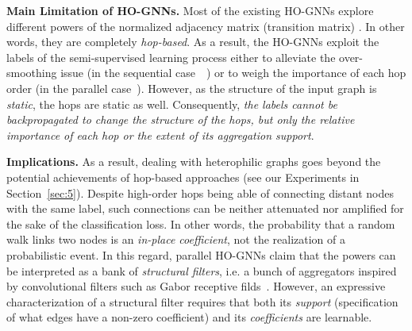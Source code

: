 \documentclass{article}
\theoremstyle{plain}
\theoremstyle{definition}
\begin{document}
\textbf{Main Limitation of HO-GNNs.} Most of the existing HO-GNNs explore different powers 
of the normalized adjacency matrix (transition matrix) . In  other words, they are completely \emph{hop-based}. 
As a result, the HO-GNNs exploit the labels of the semi-supervised learning process either to alleviate the over-smoothing issue (in the sequential case~\citep{Twosides22}\citep{abboud2022shortest}~\citep{song2023ordered}) or to weigh the importance of each hop order (in the parallel case~\citep{mixhop19}\citep{FSGNN21}\citep{DualNet22}\citep{sign_icml_grl2020}). However, as the structure of the input graph is \emph{static}, the hops are static as well. Consequently, \emph{the labels cannot be backpropagated 
to change the structure of the hops, but only the relative importance of each hop or the extent of its  aggregation support}.

\textbf{Implications.} As a result, dealing with heterophilic graphs goes beyond the potential achievements of hop-based approaches (see our Experiments in Section~\ref{sec:5}). Despite high-order hops being able of connecting distant 
nodes with the same label, such connections can be neither attenuated nor amplified for the sake of the classification loss. In other words, the probability that a random walk links two nodes is an \emph{in-place coefficient}, not the realization of a probabilistic event. In this regard, parallel HO-GNNs claim that the powers  can be interpreted as a bank of \emph{structural filters}, i.e. a bunch of aggregators inspired by convolutional filters such as Gabor receptive filds~\citep{mixhop19}. However, an expressive characterization of a structural filter requires that both its \emph{support} (specification of what edges have a non-zero coefficient) and its \emph{coefficients} are learnable.  
\end{document}
